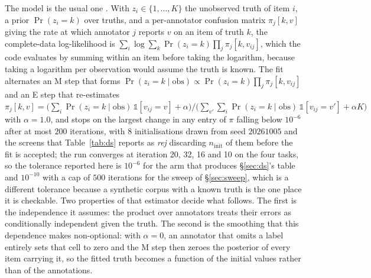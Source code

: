 \documentclass{article}
\begin{document}
The model is the usual one \cite{dawidskene1979}. With $z_i \in \{1,\dots,K\}$ the unobserved truth of item $i$, a prior $\Pr(z_i = k)$ over truths, and a per-annotator confusion matrix $\pi_j[k,v]$ giving the rate at which annotator $j$ reports $v$ on an item of truth $k$, the complete-data log-likelihood is $\sum_i \log \sum_k \Pr(z_i = k) \prod_j \pi_j[k, v_{ij}]$, which the code evaluates by summing within an item before taking the logarithm, because taking a logarithm per observation would assume the truth is known. The fit alternates an M step that forms $\Pr(z_i = k \mid \mathrm{obs}) \propto \Pr(z_i=k)\prod_j \pi_j[k,v_{ij}]$ and an E step that re-estimates $\pi_j[k,v] = \big(\sum_i \Pr(z_i = k \mid \mathrm{obs})\,\mathbb{1}[v_{ij}=v] + \alpha\big) / \big(\sum_{v'}\sum_i \Pr(z_i=k\mid \mathrm{obs})\,\mathbb{1}[v_{ij}=v'] + \alpha K\big)$ with $\alpha = 1.0$, and stops on the largest change in any entry of $\pi$ falling below $10^{-6}$ after at most $200$ iterations, with $8$ initialisations drawn from seed $20261005$ and the screens that Table~\ref{tab:ds} reports as \emph{rej} discarding $n_{\mathrm{init}}$ of them before the fit is accepted; the run converges at iteration 20, 32, 16 and 10 on the four tasks, so the tolerance reported here is $10^{-6}$ for the arm that produces \S\ref{sec:ds}'s table and $10^{-10}$ with a cap of $500$ iterations for the sweep of \S\ref{sec:sweep}, which is a different tolerance because a synthetic corpus with a known truth is the one place it is checkable. Two properties of that estimator decide what follows. The first is the independence it assumes: the product over annotators treats their errors as conditionally independent given the truth. The second is the smoothing that this dependence makes non-optional: with $\alpha = 0$, an annotator that omits a label entirely sets that cell to zero and the M step then zeroes the posterior of every item carrying it, so the fitted truth becomes a function of the initial values rather than of the annotations. 
\end{document}
